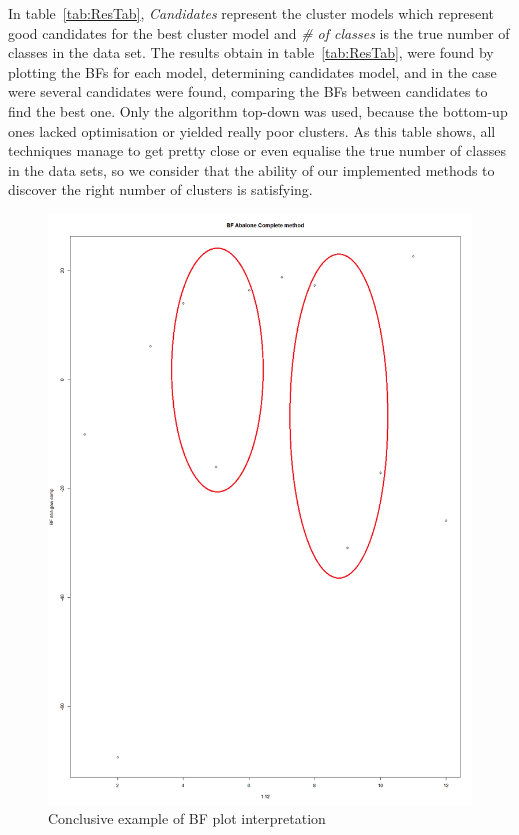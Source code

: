 \documentclass[twocolumn,12pt]{article}
\begin{document}
In table~\ref{tab:ResTab}, \emph{Candidates} represent the cluster models which represent good candidates for the best cluster model and \emph{\# of classes} is the true number of classes in the data set.
The results obtain in table~\ref{tab:ResTab}, were found by plotting the BFs for each model, determining candidates model, and in the case were several candidates were found, comparing the BFs between candidates to find the best one.
Only the algorithm top-down was used, because the bottom-up ones lacked optimisation or yielded really poor clusters.
As this table shows, all techniques manage to get pretty close or even equalise the true number of classes in the data sets, so we consider that the ability of our implemented methods to discover the right number of clusters is satisfying.
\begin{figure}[!]
    \centering
    \includegraphics[scale=0.3]{img/BFplot.png}
    \caption{Conclusive example of BF plot interpretation}
    \label{fig:BFplotConclusive}
\end{figure}
\end{document}
